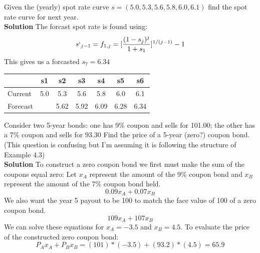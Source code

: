 \documentclass[12pt]{article}
\newenvironment{problem}[3][Problem]{\begin{trivlist}
\item[\hskip \labelsep {\bfseries #1}\hskip \labelsep {\bfseries #2.}]}{\end{trivlist}}
\begin{document}
\begin{problem}2. Given the (yearly) spot rate curve $s=(5.0,5.3,5.6,5.8,6.0,6.1)$ find the spot rate curve for next year. \\
\textbf{Solution} The forcast spot rate is found using:
$$ s`_{j-1}= f_{1,j}=[\frac{(1-s_j)^j}{1+s_1}]^{1/(j-1)}-1 $$
This gives us a forcasted  $s_7 = 6.34$\\

\begin{tabular}{l|cccccc}
                 & s1  & s2     & s3    & s4     & s5    & s6 \\ 
\hline
  Current  & 5.0 & 5.3   & 5.6   & 5.8   & 6.0   & 6.1 \\
  Forecast  &     &  5.62 & 5.92 & 6.09 & 6.28 & 6.34  \\
\end{tabular}
\end{problem}

\begin{problem}3. Consider two 5-year bonds: one has 9\% coupon and sells for 101.00; the other has a 7\% coupon and sells for 93.30 Find the price of a 5-year (zero?) coupon bond. (This question is confusing but I'm assuming it is following the structure of Example 4.3)  \\
\textbf{Solution} To construct a zero coupon bond we first must make the sum of the coupons equal zero: Let $x_A$ represent the amount of the 9\% coupon bond and $x_B$ represent the amount of the 7\% coupon bond held. 
$$ 0.09x_A + 0.07x_B $$
We also want the year 5 payout to be 100 to match the face value of 100 of a zero coupon bond. 
$$ 109x_A + 107x_B $$
We can solve these equations for $x_A=-3.5$ and $x_B=4.5$. To evaluate the price of the constructed zero coupon bond: 
$$ P_Ax_A + P_Bx_B = (101)*(-3.5) + (93.2)*(4.5) = 65.9 $$

\end{problem}
\end{document}
